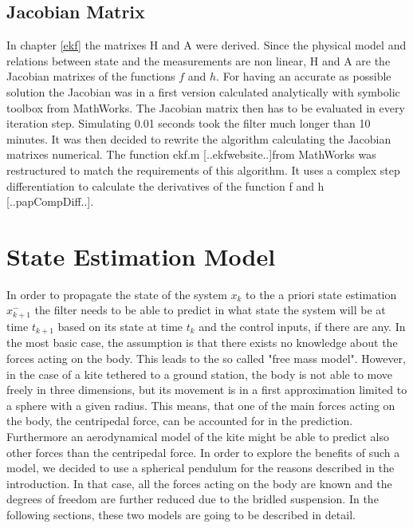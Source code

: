 \subsection*{Jacobian Matrix}
In chapter \ref{ekf} the matrixes H and A were derived. Since the physical model and relations between state and the measurements are non linear, H and A are the Jacobian matrixes of the functions $f$ and $h$. For having an accurate as possible solution the Jacobian was in a first version calculated analytically with symbolic toolbox from MathWorks. The Jacobian matrix then has to be evaluated in every iteration step. Simulating 0.01 seconds took the filter much longer than 10 minutes. It was then decided to rewrite the algorithm calculating the Jacobian matrixes numerical. The function ekf.m [..ekfwebsite..]from MathWorks was restructured to match the requirements of this algorithm. It uses a complex step differentiation to calculate the derivatives of the function f and h [..papCompDiff..]. 


\section{State Estimation Model}\label{state_estimation}
In order to propagate the state of the system $x_{k}$ to the a priori state estimation $x^{-}_{k+1}$ the filter needs to be able to predict in what state the system will be at time $t_{k+1}$ based on its state at time $t_{k}$ and the control inputs, if there are any. In the most basic case, the assumption is that there exists no knowledge about the forces acting on the body. This leads to the so called "free mass model". However, in the case of a kite tethered to a ground station, the body is not able to move freely in three dimensions, but its movement is in a first approximation limited to a sphere with a given radius. This means, that one of the main forces acting on the body, the centripedal force, can be accounted for in the prediction. Furthermore an aerodynamical model of the kite might be able to predict also other forces than the centripedal force. In order to explore the benefits of such a model, we decided to use a spherical pendulum for the reasons described in the introduction. In that case, all the forces acting on the body are known and the degrees of freedom are further reduced due to the bridled suspension. In the following sections, these two models are going to be described in detail. 

